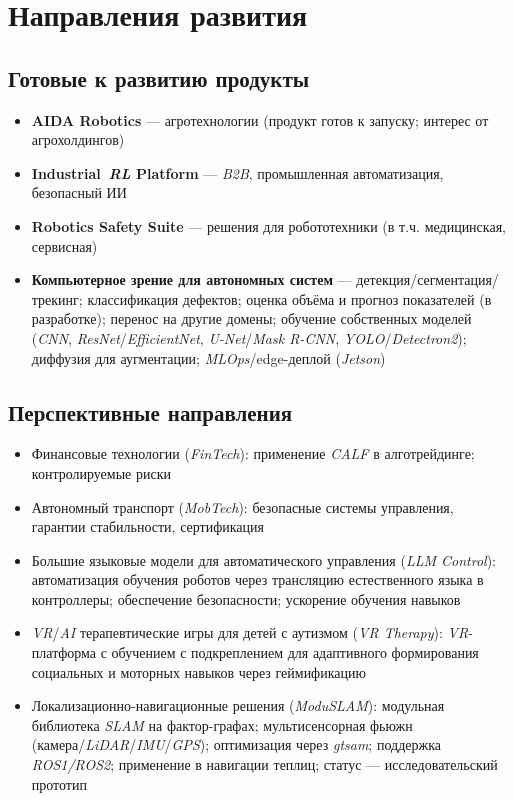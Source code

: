 \documentclass[12pt,a4paper]{article}
\begin{document}
\section{Направления развития}
\subsection*{Готовые к развитию продукты}
\begin{itemize}
    \item \textbf{AIDA Robotics} --- агротехнологии (продукт готов к запуску; интерес от агрохолдингов)
    \item \textbf{Industrial~\textit{RL} Platform} --- \textit{B2B}, промышленная автоматизация, безопасный ИИ
    \item \textbf{Robotics Safety Suite} --- решения для робототехники (в т.ч. медицинская, сервисная)
    \item \textbf{Компьютерное зрение для автономных систем} --- детекция/сегментация/трекинг; классификация дефектов; оценка объёма и прогноз показателей (в разработке); перенос на другие домены; обучение собственных моделей (\textit{CNN}, \textit{ResNet}/\textit{EfficientNet}, \textit{U-Net}/\textit{Mask R-CNN}, \textit{YOLO}/\textit{Detectron2}); диффузия для аугментации; \textit{MLOps}/edge-деплой (\textit{Jetson})
\end{itemize}

\subsection*{Перспективные направления}
\begin{itemize}
    \item Финансовые технологии (\textit{FinTech}): применение \textit{CALF} в алготрейдинге; контролируемые риски
    \item Автономный транспорт (\textit{MobTech}): безопасные системы управления, гарантии стабильности, сертификация
    \item Большие языковые модели для автоматического управления (\textit{LLM Control}): автоматизация обучения роботов через трансляцию естественного языка в контроллеры; обеспечение безопасности; ускорение обучения навыков
    \item \textit{VR}/\textit{AI} терапевтические игры для детей с аутизмом (\textit{VR Therapy}): \textit{VR}-платформа с обучением с подкреплением для адаптивного формирования социальных и моторных навыков через геймификацию
    \item Локализационно-навигационные решения (\textit{ModuSLAM}): модульная библиотека \textit{SLAM} на фактор-графах; мультисенсорная фьюжн (камера/\textit{LiDAR}/\textit{IMU}/\textit{GPS}); оптимизация через \textit{gtsam}; поддержка \textit{ROS1/ROS2}; применение в навигации теплиц; статус --- исследовательский прототип

\end{itemize}
\end{document}
